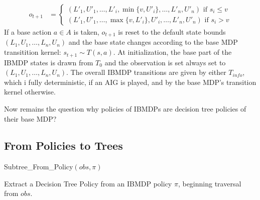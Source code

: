 \begin{definition}
\begin{itemize}
\begin{align*}
    o_{t+1} &= \begin{cases}
        (L'_1, U'_1, \dots , L'_i, \min\{v, U'_i\}, \dots , L'_n, U'_n) \text{ if } s_i \leq v\\
        (L'_1, U'_1, \dots , \max\{v, L'_i\}, U'_i, \dots , L'_n, U'_n) \text{ if } s_i > v
    \end{cases}
\end{align*}
If a base action $a\in A$ is taken, $o_{t+1}$ is reset to the default state bounds $(L_1, U_1,\dots, L_n, U_n)$ and the base state changes according to the base MDP transitition kernel: $s_{t+1}\sim T(s, a)$.
At initialization, the base part of the IBMDP states is drawn from $T_0$ and the observation is set always set to $(L_1, U_1,\dots, L_n, U_n)$.
The overall IBMDP transitions are given by either $T_{info}$, which i fully deterministic, if an AIG is played, and by the base MDP's transition kernel otherwise.
\end{itemize}
\end{definition}
Now remains the question why policies of IBMDPs are decision tree policies of their base MDP? 

\subsection{From Policies to Trees}
\begin{algorithm}[t]
    
    
    
    \Return Subtree\_From\_Policy$(obs, \pi)$
    \caption{Extract a Decision Tree Policy from an IBMDP policy $\pi$, beginning traversal from $obs$.}\label{alg_extract_tree}
\end{algorithm}

